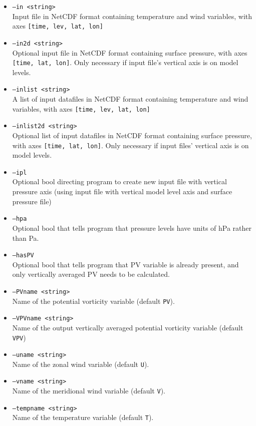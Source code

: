 \documentclass{article}
\begin{document}
\begin{itemize}
\item[]\texttt{--in <string>} \\ Input file in NetCDF format containing temperature and wind variables, with axes \texttt{[time, lev, lat, lon]}
\item[]\texttt{--in2d <string>} \\ Optional input file in NetCDF format containing surface pressure, with axes \texttt{[time, lat, lon]}. Only necessary if input file's vertical axis is on model levels.
\item[]\texttt{--inlist <string>} \\ A list of input datafiles in NetCDF format containing temperature and wind variables, with axes \texttt{[time, lev, lat, lon]}
\item[]\texttt{--inlist2d <string>} \\ Optional list of input datafiles in NetCDF format containing surface pressure, with axes \texttt{[time, lat, lon]}. Only necessary if input files' vertical axis is on model levels.
\item[]\texttt{--ipl}\\ Optional bool directing program to create new input file with vertical pressure axis (using input file with vertical model level axis and surface pressure file)
\item[]\texttt{--hpa} \\ Optional bool that tells program that pressure levels have units of hPa rather than Pa.
\item[]\texttt{--hasPV} \\ Optional bool that tells program that PV variable is already present, and only vertically averaged PV needs to be calculated.
\item[] \texttt{--PVname <string>}\\Name of the potential vorticity variable (default \texttt{PV}).
\item[]\texttt{--VPVname <string>}\\Name of the output vertically averaged potential vorticity variable (default \texttt{VPV})
\item[] \texttt{--uname <string>}\\Name of the zonal wind variable (default \texttt{U}).
\item[] \texttt{--vname <string>}\\Name of the meridional wind variable (default \texttt{V}).
\item[] \texttt{--tempname <string>}\\Name of the temperature variable (default \texttt{T}).
\end{itemize}
\end{document}

